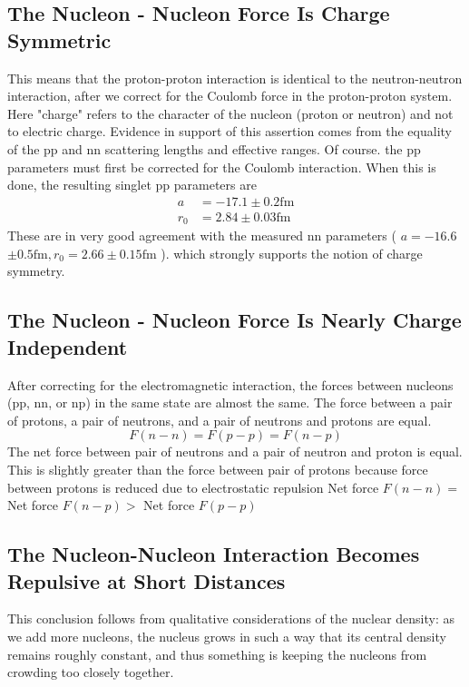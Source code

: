 \subsection{ The Nucleon - Nucleon Force Is Charge Symmetric}
This means that the proton-proton interaction is identical to the neutron-neutron interaction, after we correct for the Coulomb force in the proton-proton system. Here "charge" refers to the character of the nucleon (proton or neutron) and not to electric charge. Evidence in support of this assertion comes from the equality of the pp and nn scattering lengths and effective ranges. Of course. the pp parameters must first be corrected for the Coulomb interaction. When this is done, the resulting singlet pp parameters are
 \begin{align*}
	a&=-17.1 \pm 0.2 \mathrm{fm} \\
	r_{0}&=2.84 \pm 0.03 \mathrm{fm}
\end{align*}
These are in very good agreement with the measured nn parameters ( $a=-16.6$ $\pm 0.5 \mathrm{fm}, r_{0}=2.66 \pm 0.15 \mathrm{fm}$ ). which strongly supports the notion of charge symmetry.
\subsection{The Nucleon - Nucleon Force Is Nearly Charge Independent}
After correcting for the electromagnetic interaction, the forces between nucleons (pp, nn, or np) in the same state are almost the same.
The force between a pair of protons, a pair of neutrons, and a pair of neutrons and protons are equal.
$$
F(n-n)=F(p-p)=F(n-p)
$$
The net force between pair of neutrons and a pair of neutron and proton is equal. This is slightly greater than the force between pair of protons because force between protons is reduced due to electrostatic repulsion
Net force $F(n-n)=$ Net force $F(n-p)>$ Net force $F(p-p)$
\subsection{The Nucleon-Nucleon Interaction Becomes Repulsive at Short Distances}
This conclusion follows from qualitative considerations of the nuclear density: as we add more nucleons, the nucleus grows in such a way that its central density remains roughly constant, and thus something is keeping the nucleons from crowding too closely together.
